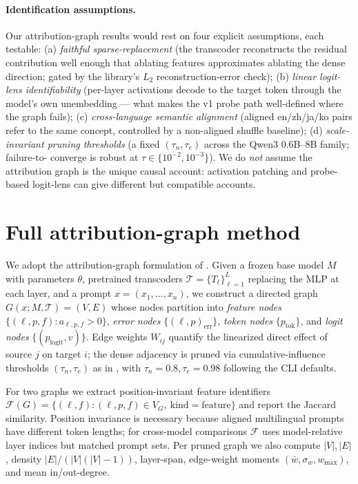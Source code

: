 \paragraph{Identification assumptions.} Our attribution-graph results would rest on four
explicit assumptions, each testable: (a) \emph{faithful sparse-replacement} (the transcoder
reconstructs the residual contribution well enough that ablating features approximates
ablating the dense direction; gated by the library's $L_2$ reconstruction-error check); (b)
\emph{linear logit-lens identifiability} (per-layer activations decode to the target token
through the model's own unembedding --- what makes the v1 probe path well-defined where the
graph fails); (c) \emph{cross-language semantic alignment} (aligned en/zh/ja/ko pairs refer
to the same concept, controlled by a non-aligned shuffle baseline); (d) \emph{scale-invariant
pruning thresholds} (a fixed $(\tau_n,\tau_e)$ across the Qwen3 0.6B--8B family; failure-to-
converge is robust at $\tau\in\{10^{-2},10^{-3}\}$). We do \emph{not} assume the attribution
graph is the unique causal account: activation patching and probe-based logit-lens can give
different but compatible accounts.

\section{Full attribution-graph method}\label{app:method_full}

We adopt the attribution-graph formulation of \citet{ameisen2025attribution}. Given a frozen
base model $M$ with parameters $\theta$, pretrained transcoders
$\mathcal{T}=\{T_\ell\}_{\ell=1}^{L}$ replacing the MLP at each layer, and a prompt
$x=(x_1,\dots,x_n)$, we construct a directed graph $G(x;M,\mathcal{T})=(V,E)$ whose nodes
partition into \emph{feature nodes} $\{(\ell,p,f):a_{\ell,p,f}>0\}$, \emph{error nodes}
$\{(\ell,p)_{\text{err}}\}$, \emph{token nodes} $\{p_\text{tok}\}$, and \emph{logit nodes}
$\{(p_\text{logit},v)\}$. Edge weights $W_{ij}$ quantify the linearized direct effect of
source $j$ on target $i$; the dense adjacency is pruned via cumulative-influence thresholds
$(\tau_n,\tau_e)$ as in \citet{ameisen2025attribution}, with $\tau_n=0.8,\tau_e=0.98$
following the \circuittracer{} CLI defaults.

For two graphs we extract position-invariant feature identifiers
$\mathcal{F}(G)=\{(\ell,f):(\ell,p,f)\in V_G,\ \text{kind}=\text{feature}\}$ and report the
Jaccard similarity. Position invariance is necessary because aligned multilingual prompts
have different token lengths; for cross-model comparisons $\mathcal{F}$ uses model-relative
layer indices but matched prompt sets. Per pruned graph we also compute $|V|,|E|$, density
$|E|/(|V|(|V|-1))$, layer-span, edge-weight moments $(\bar w,\sigma_w,w_{\max})$, and mean
in/out-degree.


